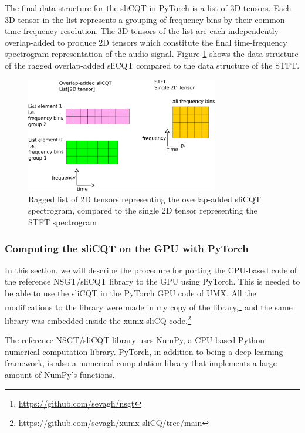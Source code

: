 \documentclass[report.tex]{subfiles}
\begin{document}
The final data structure for the sliCQT in PyTorch is a list of 3D tensors. Each 3D tensor in the list represents a grouping of frequency bins by their common time-frequency resolution. The 3D tensors of the list are each independently overlap-added to produce 2D tensors which constitute the final time-frequency spectrogram representation of the audio signal. Figure \ref{fig:2dslicqolastft} shows the data structure of the ragged overlap-added sliCQT compared to the data structure of the STFT.

\begin{figure}[ht]
	\centering
	\includegraphics[width=0.75\textwidth]{./images-blockdiagrams/2dslicqolastft.png}
	\caption{Ragged list of 2D tensors representing the overlap-added sliCQT spectrogram, compared to the single 2D tensor representing the STFT spectrogram}
	\label{fig:2dslicqolastft}
\end{figure}

\subsubsection{Computing the sliCQT on the GPU with PyTorch}
\label{sec:torchslicq}

In this section, we will describe the procedure for porting the CPU-based code of the reference NSGT/sliCQT library to the GPU using PyTorch. This is needed to be able to use the sliCQT in the PyTorch GPU code of UMX. All the modifications to the library were made in my copy of the library,\footnote{\url{https://github.com/sevagh/nsgt}} and the same library was embedded inside the xumx-sliCQ code.\footnote{\url{https://github.com/sevagh/xumx-sliCQ/tree/main}}

The reference NSGT/sliCQT library uses NumPy, a CPU-based Python numerical computation library. PyTorch, in addition to being a deep learning framework, is also a numerical computation library that implements a large amount of NumPy's functions.
\end{document}
